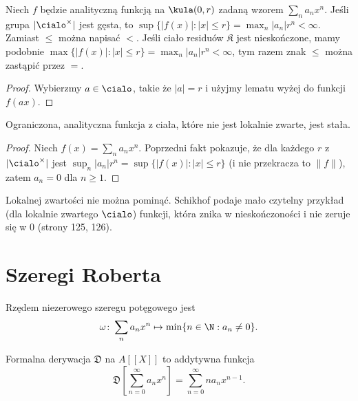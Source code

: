 \begin{fakt}
	Niech $f$ będzie analityczną funkcją na $\kula(0, r)$ zadaną wzorem $\sum_n a_n x^n$.
	Jeśli grupa $|\cialo^\times|$ jest gęsta, to
	$\sup \{|f(x)| : |x| \le r\} = \max_n |a_n| r^n < \infty$.
	Zamiast $\le$ można napisać $<$.
	Jeśli ciało residuów $\mathfrak K$ jest nieskończone, mamy podobnie $\max \{|f(x)| : |x| \le r\} = \max_n |a_n|r^n < \infty$, tym razem znak $\le$ można zastąpić przez $=$.
 \end{fakt}

 \begin{proof}
 	Wybierzmy $a \in \cialo$, takie że $|a| = r$ i użyjmy lematu wyżej do funkcji $f(ax)$.
 \end{proof}

\begin{twierdzenie}[Liouville]
	Ograniczona, analityczna funkcja z ciała, które nie jest lokalnie zwarte, jest stała.
\end{twierdzenie}

\begin{proof}
	Niech $f(x) = \sum_n a_nx^n$.
	Poprzedni fakt pokazuje, że dla każdego $r$ z $|\cialo^\times|$ jest $\sup_n |a_n| r^n = \sup\{|f(x)| : |x| \le r\}$ (i nie przekracza to $\|f\|$), zatem $a_n = 0$ dla $n \ge 1$.
\end{proof}

Lokalnej zwartości nie można pominąć.
Schikhof podaje mało czytelny przykład (dla lokalnie zwartego $\cialo$) funkcji, która znika w nieskończoności i nie zeruje się w $0$ (strony 125, 126).









\section{Szeregi Roberta}










\begin{definicja}
	Rzędem niezerowego szeregu potęgowego jest
	\[
		\omega \colon \sum_n a_n x^n \mapsto \min \{n \in \N: a_n \neq 0\}.
	\]
\end{definicja}

\begin{definicja}
	Formalna derywacja $\mathfrak D$ na $A[[X]]$ to addytywna funkcja
	\[
		\mathfrak D \left[\sum_{n=0}^\infty a_n x^n \right] = \sum_{n=0}^\infty n a_n x^{n-1}.
	\]
\end{definicja}

